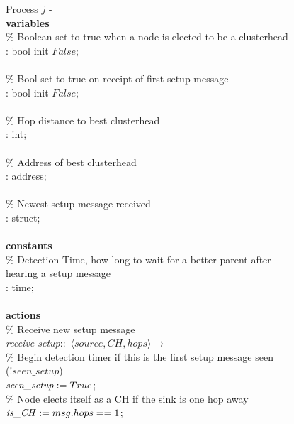 \begin{figure}[H]
  \centering
  \begin{boxedminipage}{\linewidth}
    \null Process $j$ - \\
    \null \textbf{variables}\\
    \null\qq \% Boolean set to true when a node is elected to be a clusterhead\\
    \null\qq {}: bool init $False$;\\~\\
    \null\qq \% Bool set to true on receipt of first setup message\\
    \null\qq {}: bool init $False$;\\~\\
    \null\qq \% Hop distance to best clusterhead\\
    \null\qq {}: int;\\~\\
    \null\qq \% Address of best clusterhead\\
    \null\qq {}: address;\\~\\
    \null\qq \% Newest setup message received\\
    \null\qq {}: struct;\\~\\
    \null \textbf{constants}\\
    \null\qq \% Detection Time, how long to wait for a better parent after hearing a setup message\\
    \null\qq {}: time;\\~\\
    \null \textbf{actions}\\
    \null\qq \% Receive new setup message\\
    \null\qq \emph{receive-setup}::~$\langle source, CH, hops\rangle \rightarrow$\\
    \null\qq\qq \% Begin detection timer if this is the first setup message seen\\
    \null\qq\qq {} (!$seen\_setup$)  \\
    \null\qq\qq\qq $\mbox{\emph{seen\_setup}} \mathrel{:=} True$;\\
    \null\qq\qq\qq \% Node elects itself as a CH if the sink is one hop away\\
    \null\qq\qq\qq $\mbox{\emph{is\_CH}} \mathrel{:=} msg.hops == 1$;\\

\end{boxedminipage}
\end{figure}
